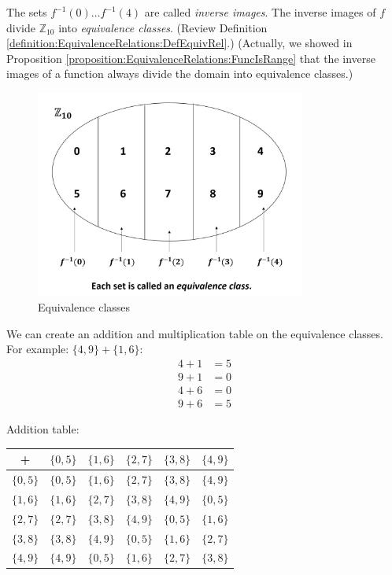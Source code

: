 \begin{example}{}
The sets $f^{-1}(0)\dots f^{-1}(4)$ are called \textit{inverse images}. The inverse images of $f$ divide ${\mathbb Z}_{10}$ into \textit{equivalence classes}.  (Review Definition \ref{definition:EquivalenceRelations:DefEquivRel}.)
(Actually, we showed in Proposition \ref{proposition:EquivalenceRelations:FuncIsRange} that the inverse images of a function always divide the domain into equivalence classes.)\\

\begin{figure}[H]
\begin{center}
\centerline {
\includegraphics[width=3.5in]{images/Equivalence Class Image.jpg} }
\end{center}
\caption{Equivalence classes}\label{fig:equiv_class}
\end{figure}

We can create an addition and multiplication table on the equivalence classes. For example: $\{4,9\}+\{1,6\}$:
\begin{align*}
4+1&=5\\
9+1&=0\\
4+6&=0\\
9+6&=5
\end{align*}

Addition table:

\begin{center}
\begin{tabular}{c|c|c|c|c|c}
+ & $\{0,5\}$ & $\{1,6\}$ & $\{2,7\}$ & $\{3,8\}$ & $\{4,9\}$ \\
\hline
$\{0,5\}$ & $\{0,5\}$ & $\{1,6\}$ & $\{2,7\}$ & $\{3,8\}$ & $\{4,9\}$ \\
\hline
$\{1,6\}$ & $\{1,6\}$ & $\{2,7\}$ & $\{3,8\}$ & $\{4,9\}$ & $\{0,5\}$ \\
\hline
$\{2,7\}$ & $\{2,7\}$ & $\{3,8\}$ & $\{4,9\}$ & $\{0,5\}$ & $\{1,6\}$ \\
\hline
$\{3,8\}$ & $\{3,8\}$ & $\{4,9\}$ & $\{0,5\}$ & $\{1,6\}$ & $\{2,7\}$ \\
\hline
$\{4,9\}$ & $\{4,9\}$ & $\{0,5\}$ & $\{1,6\}$ & $\{2,7\}$ & $\{3,8\}$ 
\end{tabular}\\
\end{center}


\end{example}
